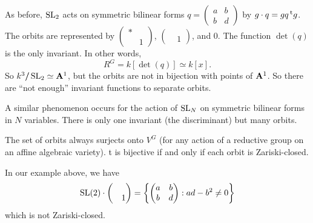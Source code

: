 \begin{example}
As before, $\operatorname{SL}_2$ acts on symmetric bilinear forms 
$q=\begin{pmatrix} a & b \\ b & d \end{pmatrix}$ by 
$g\cdot q= g q \prescript{\mathrm{t}}{}{g}$. The orbits are represented by 
$\begin{pmatrix} \ast \\ & 1 \end{pmatrix}$, 
$\begin{pmatrix} \\ & 1 \end{pmatrix}$, and $0$. The function 
$\det(q)$ is the only invariant. In other words, 
\[
  R^G=k[\det(q)]\simeq k[x] .
\]
So $k^3/ \! \! \! / \operatorname{SL}_2\simeq \mathbf{A}^1$, but the orbits are not in 
bijection with points of $\mathbf{A}^1$. So there are ``not enough'' invariant 
functions to separate orbits. 
\end{example}

A similar phenomenon occurs for the action of $\operatorname{SL}_N$ on 
symmetric bilinear forms in $N$ variables. There is only one invariant (the 
discriminant) but many orbits. 

\begin{theo}
The set of orbits always surjects onto $V^G$ (for any action of a reductive 
group on an affine algebraic variety). t is bijective if and only if each orbit 
is Zariski-closed. 
\end{theo}

In our example above, we have
\[
  \operatorname{SL}(2)\cdot \begin{pmatrix} \\ & 1\end{pmatrix} = \left\{\begin{pmatrix} a & b \\ b & d \end{pmatrix} : a d-b^2\ne 0\right\} 
\]
which is not Zariski-closed. 



